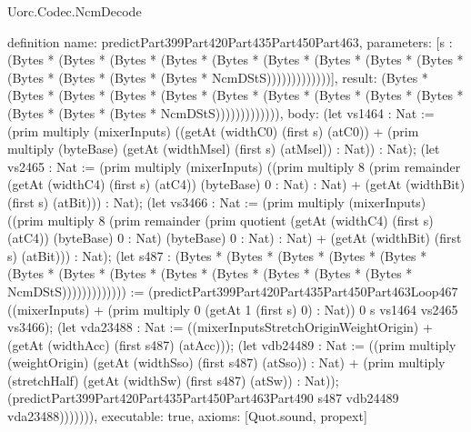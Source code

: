 \begin{lexlean}{Uorc.Codec.NcmDecode}
\begin{semanticmodule}
definition{
  name: predictPart399Part420Part435Part450Part463,
  parameters: [s : (Bytes * (Bytes * (Bytes * (Bytes * (Bytes * (Bytes * (Bytes * (Bytes * (Bytes * (Bytes * (Bytes * (Bytes * (Bytes * NcmDStS)))))))))))))],
  result: (Bytes * (Bytes * (Bytes * (Bytes * (Bytes * (Bytes * (Bytes * (Bytes * (Bytes * (Bytes * (Bytes * (Bytes * (Bytes * NcmDStS))))))))))))),
  body: (let vs1464 : Nat := (prim multiply (mixerInputs) ((getAt (widthC0) (first s) (atC0)) + (prim multiply (byteBase) (getAt (widthMsel) (first s) (atMsel)) : Nat)) : Nat); (let vs2465 : Nat := (prim multiply (mixerInputs) ((prim multiply 8 (prim remainder (getAt (widthC4) (first s) (atC4)) (byteBase) 0 : Nat) : Nat) + (getAt (widthBit) (first s) (atBit))) : Nat); (let vs3466 : Nat := (prim multiply (mixerInputs) ((prim multiply 8 (prim remainder (prim quotient (getAt (widthC4) (first s) (atC4)) (byteBase) 0 : Nat) (byteBase) 0 : Nat) : Nat) + (getAt (widthBit) (first s) (atBit))) : Nat); (let s487 : (Bytes * (Bytes * (Bytes * (Bytes * (Bytes * (Bytes * (Bytes * (Bytes * (Bytes * (Bytes * (Bytes * (Bytes * (Bytes * NcmDStS))))))))))))) := (predictPart399Part420Part435Part450Part463Loop467 ((mixerInputs) + (prim multiply 0 (getAt 1 (first s) 0) : Nat)) 0 s vs1464 vs2465 vs3466); (let vda23488 : Nat := ((mixerInputsStretchOriginWeightOrigin) + (getAt (widthAcc) (first s487) (atAcc))); (let vdb24489 : Nat := ((prim multiply (weightOrigin) (getAt (widthSso) (first s487) (atSso)) : Nat) + (prim multiply (stretchHalf) (getAt (widthSw) (first s487) (atSw)) : Nat)); (predictPart399Part420Part435Part450Part463Part490 s487 vdb24489 vda23488))))))),
  executable: true,
  axioms: [Quot.sound, propext]
}


\end{semanticmodule}
\end{lexlean}
